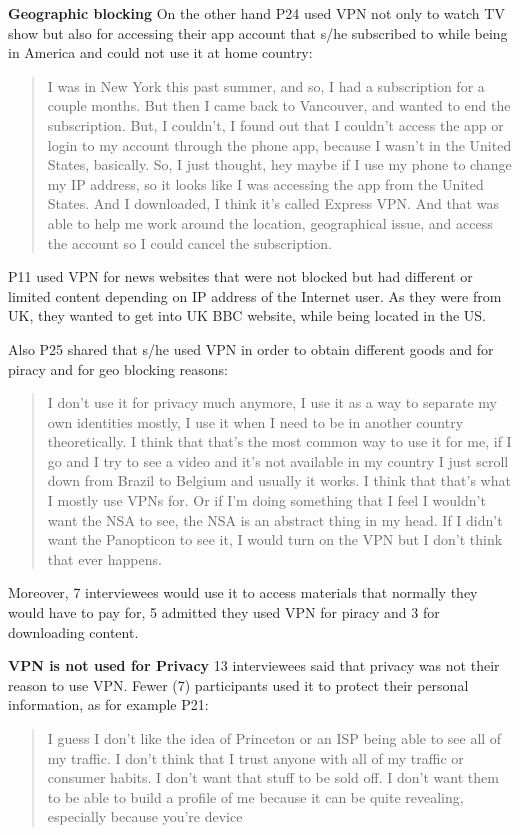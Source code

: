 \textbf{Geographic blocking} On the other hand P24 used VPN not only to watch
TV show but also for accessing their app account that s/he subscribed to while
being in America and could not use it at home country: \begin{quote}I was in
New York this past summer, and so, I had a subscription for a couple months.
But then I came back to Vancouver, and wanted to end the subscription. But, I
couldn't, I found out that I couldn't access the app or login to my account
through the phone app, because I wasn't in the United States, basically. So, I
just thought, hey maybe if I use my phone to change my IP address, so it
looks like I was accessing the app from the United States. And I downloaded, I
think it's called Express VPN. And that was able to help me work around the
location, geographical issue, and access the account so I could cancel the
subscription.\end{quote}


P11 used VPN for news websites that were not blocked but had different or
limited content depending on IP address of the Internet user. As they were
from UK, they wanted to get into UK BBC website, while being located in the
US.

Also P25 shared that s/he used VPN in order to obtain different goods and for
piracy and for geo blocking reasons: \begin{quote}I don't use it for privacy
much anymore, I use it as a way to separate my own identities mostly, I use it
when I need to be in another country theoretically. I think that that's the
most common way to use it for me, if I go and I try to see a video and it's
not available in my country I just scroll down from Brazil to Belgium and
usually it works. I think that that's what I mostly use VPNs for. Or if I'm
doing something that I feel I wouldn't want  the NSA to see,  the NSA  is an abstract
thing in my head. If I didn't want the Panopticon to see it, I would turn on
the VPN but I don't think that ever happens.\end{quote}

Moreover, 7 interviewees would use it to access materials that normally they
would have to pay for, 5 admitted they used VPN for piracy and 3 for
downloading content.



\textbf{VPN is not used for Privacy} 13 interviewees said that privacy was not
their reason to use VPN. Fewer (7) participants used it to protect their
personal information, as for example P21: \begin{quote}I guess I don't like
the idea of Princeton or an ISP being able to see all of my traffic. I don't
think that I trust anyone with all of my traffic or consumer habits. I don't
want that stuff to be sold off. I don't want them to be able to build a
profile of me because it can be quite revealing, especially because you're
device\end{quote}


